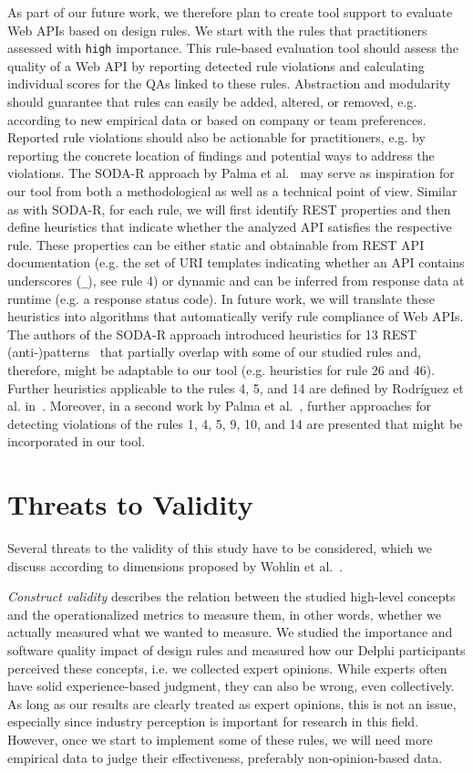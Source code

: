 \documentclass[runningheads]{llncs}
\begin{document}
As part of our future work, we therefore plan to create tool support to evaluate Web APIs based on design rules.
We start with the rules that practitioners assessed with \texttt{high} importance.
This rule-based evaluation tool should assess the quality of a Web API by reporting detected rule violations and calculating individual scores for the QAs linked to these rules.
Abstraction and modularity should guarantee that rules can easily be added, altered, or removed, e.g. according to new empirical data or based on company or team preferences.
Reported rule violations should also be actionable for practitioners, e.g. by reporting the concrete location of findings and potential ways to address the violations.
The SODA-R approach by Palma et al.~\cite{article:DetectionOfRESTPatternsAndAntipatterns} may serve as inspiration for our tool from both a methodological as well as a technical point of view.
Similar as with SODA-R, for each rule, we will first identify REST properties and then define heuristics that indicate whether the analyzed API satisfies the respective rule.
These properties can be either static and obtainable from REST API documentation (e.g. the set of URI templates indicating whether an API contains underscores (\texttt{\_}), see rule 4) or dynamic and can be inferred from response data at runtime (e.g. a response status code). 
In future work, we will translate these heuristics into algorithms that automatically verify rule compliance of Web APIs.
The authors of the SODA-R approach introduced heuristics for 13 REST (anti-)patterns~\cite{article:DetectionOfRESTPatternsAndAntipatterns} that partially overlap with some of our studied rules and, therefore, might be adaptable to our tool (e.g. heuristics for rule 26 and 46). Further heuristics applicable to the rules 4, 5, and 14 are defined by Rodríguez et al. in~\cite{article:Rodriguez2016}. Moreover, in a second work by Palma et al.~\cite{article:Palma2017}, further approaches for detecting violations of the rules 1, 4, 5, 9, 10, and 14 are presented that might be incorporated in our tool. 

\section{Threats to Validity}
\label{sec:threats}
Several threats to the validity of this study have to be considered, which we discuss according to dimensions proposed by Wohlin et al.~\cite{Wohlin2003}.

\textit{Construct validity} describes the relation between the studied high-level concepts and the operationalized metrics to measure them, in other words, whether we actually measured what we wanted to measure.
We studied the importance and software quality impact of design rules and measured how our Delphi participants perceived these concepts, i.e. we collected expert opinions.
While experts often have solid experience-based judgment, they can also be wrong, even collectively.
As long as our results are clearly treated as expert opinions, this is not an issue, especially since industry perception is important for research in this field.
However, once we start to implement some of these rules, we will need more empirical data to judge their effectiveness, preferably non-opinion-based data.
\end{document}
